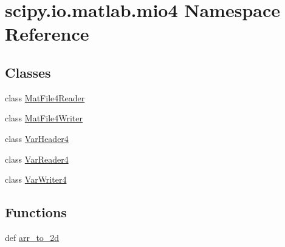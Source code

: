 \hypertarget{namespacescipy_1_1io_1_1matlab_1_1mio4}{}\section{scipy.\+io.\+matlab.\+mio4 Namespace Reference}
\label{namespacescipy_1_1io_1_1matlab_1_1mio4}
\subsection*{Classes}
\begin{DoxyCompactItemize}
\item 
class \hyperlink{classscipy_1_1io_1_1matlab_1_1mio4_1_1MatFile4Reader}{Mat\+File4\+Reader}
\item 
class \hyperlink{classscipy_1_1io_1_1matlab_1_1mio4_1_1MatFile4Writer}{Mat\+File4\+Writer}
\item 
class \hyperlink{classscipy_1_1io_1_1matlab_1_1mio4_1_1VarHeader4}{Var\+Header4}
\item 
class \hyperlink{classscipy_1_1io_1_1matlab_1_1mio4_1_1VarReader4}{Var\+Reader4}
\item 
class \hyperlink{classscipy_1_1io_1_1matlab_1_1mio4_1_1VarWriter4}{Var\+Writer4}
\end{DoxyCompactItemize}
\subsection*{Functions}
\begin{DoxyCompactItemize}
\item 
def \hyperlink{namespacescipy_1_1io_1_1matlab_1_1mio4_a6746582203df85947414e48cca84d17d}{arr\+\_\+to\+\_\+2d}
\end{DoxyCompactItemize}
